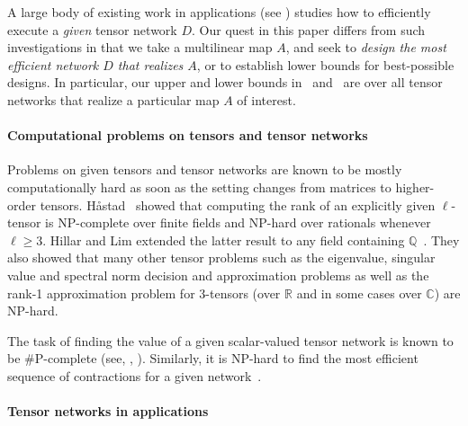 A large body of existing work in applications
(see ) %
studies
how to efficiently execute a \emph{given} tensor network $D$.
Our quest in this paper differs from such
%
investigations  %
in that
we %
take  %
a multilinear map $A$, and seek to
\emph{design the most efficient network $D$ that realizes $A$},
or to establish lower bounds for best-possible designs.
In particular, our upper and lower bounds in~
and~ are over all tensor networks that 
realize a particular map $A$ of interest.

\paragraph*{Computational problems on tensors and tensor networks}

Problems on given tensors and tensor networks are known to be mostly
computationally hard as soon as the setting changes from matrices to
higher-order tensors.
H\aa{}stad~\cite{Hastad1990} showed that computing the rank of
an explicitly given $\ell$-tensor is NP-complete over finite fields
and NP-hard over rationals whenever $\ell\geq 3$. Hillar and Lim extended the latter result to any field containing $\mathbb{Q}$~\cite{HillarL2013}. They also showed that many other tensor problems such as the eigenvalue, singular value and spectral norm decision and approximation problems as well as
the  %
rank-1 approximation problem for 3-tensors (over $\mathbb{R}$ and in some cases over $\mathbb{C}$) are NP-hard.

The task of finding the value of a given scalar-valued tensor network
is known to be $\#$P-complete (see, \eg, 
\cite{BacchusDP2003,BiamonteMT2015}).
Similarly, it is NP-hard to find the most efficient sequence of contractions
for a given network~\cite{LamSW1997,PfeiferHV2014}.

\paragraph*{Tensor networks in applications}

